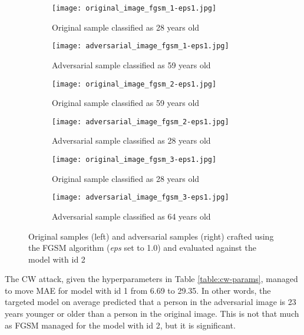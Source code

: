 \begin{figure}

\begin{subfigure}{.5\textwidth}
  \centering
  \texttt{[image: original\_image\_fgsm\_1-eps1.jpg]}
  \caption{Original sample classified as 28 years old}
\end{subfigure}
\begin{subfigure}{.5\textwidth}
  \centering
  \texttt{[image: adversarial\_image\_fgsm\_1-eps1.jpg]}
  \caption{Adversarial sample classified as 59 years old}
\end{subfigure}

\begin{subfigure}{.5\textwidth}
  \centering
  \texttt{[image: original\_image\_fgsm\_2-eps1.jpg]}
  \caption{Original sample classified as 59 years old}
\end{subfigure}
\begin{subfigure}{.5\textwidth}
  \centering
  \texttt{[image: adversarial\_image\_fgsm\_2-eps1.jpg]}
  \caption{Adversarial sample classified as 28 years old}
\end{subfigure}

\begin{subfigure}{.5\textwidth}
  \centering
  \texttt{[image: original\_image\_fgsm\_3-eps1.jpg]}
  \caption{Original sample classified as 28 years old}
\end{subfigure}
\begin{subfigure}{.5\textwidth}
  \centering
  \texttt{[image: adversarial\_image\_fgsm\_3-eps1.jpg]}
  \caption{Adversarial sample classified as 64 years old}
\end{subfigure}

\caption{Original samples (left) and adversarial samples (right) crafted using the FGSM algorithm (\textit{eps} set to 1.0) and evaluated against the model with id 2}
\label{fig:fgsm-attack-eps1}
\end{figure}

The CW attack, given the hyperparameters in Table \ref{table:cw-params}, managed to move MAE for model with id 1 from 6.69 to 29.35. In other words, the targeted model on average predicted that a person in the adversarial image is 23 years younger or older than a person in the original image. This is not that much as FGSM managed for the model with id 2, but it is significant.

